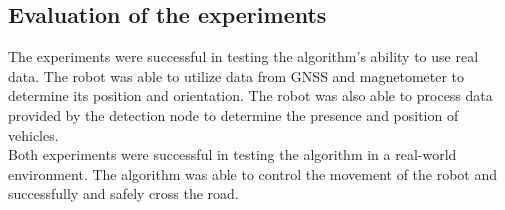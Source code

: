     \subsection{Evaluation of the experiments}
        The experiments were successful in testing the algorithm's ability to use real data. The robot was able to utilize data from GNSS and magnetometer to determine its position and orientation. The robot was also able to process data provided by the detection node to determine the presence and position of vehicles.\\
        Both experiments were successful in testing the algorithm in a real-world environment. The algorithm was able to control the movement of the robot and successfully and safely cross the road.
